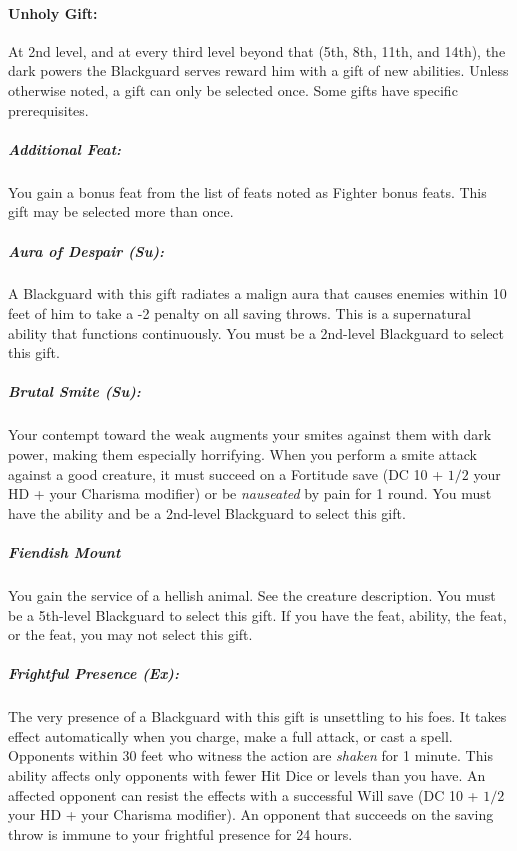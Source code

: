 \paragraph[Unholy Gift]{Unholy Gift:}
\label{sec:UnholyGift}
At 2nd level, and at every third level beyond that (5th, 8th, 11th, and 14th), the dark powers the Blackguard serves reward him with a gift of new abilities. Unless otherwise noted, a gift can only be selected once. Some gifts have specific prerequisites.

\subparagraph{Additional Feat:}
You gain a bonus feat from the list of feats noted as Fighter bonus feats.
This gift may be selected more than once.

\subparagraph{Aura of Despair (Su):}
A Blackguard with this gift radiates a malign aura that causes enemies within 10 feet of him to take a -2 penalty on all saving throws. This is a supernatural ability that functions continuously. You must be a 2nd-level Blackguard to select this gift.

\subparagraph{Brutal Smite (Su):}
Your contempt toward the weak augments your smites against them with dark power, making them especially horrifying.
When you perform a smite attack against a good creature, it must succeed on a Fortitude save (DC 10 + $1/2$ your HD + your Charisma modifier) or be \emph{nauseated} by pain for 1 round. You must have the  ability and be a 2nd-level Blackguard to select this gift.

\subparagraph{Fiendish Mount}
\label{sec:FiendishMountListing}
You gain the service of a hellish animal. See the  creature description. You must be a 5th-level Blackguard to select this gift. If you have the  feat,  ability, the  feat, or the  feat, you may not select this gift.

\subparagraph{Frightful Presence (Ex):}
The very presence of a Blackguard with this gift is unsettling to his foes. 
It takes effect automatically when you charge, make a full attack, or cast a spell. 
Opponents within 30 feet who witness the action are \emph{shaken} for 1 minute.
This ability affects only opponents with fewer Hit Dice or levels than you have. 
An affected opponent can resist the effects with a successful Will save (DC 10 + $1/2$ your HD + your Charisma modifier). 
An opponent that succeeds on the saving throw is immune to your frightful presence for 24 hours.

